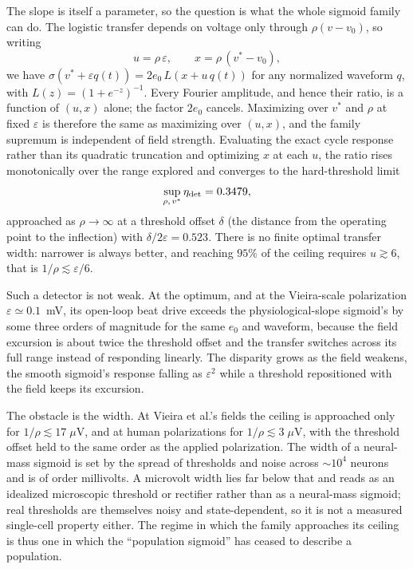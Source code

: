\documentclass[11pt,a4paper]{article}
\newcommand{\Sig}{\sigma}
\begin{document}
The slope is itself a parameter, so the question is what the whole sigmoid family can do.
The logistic transfer depends on voltage only through $\rho(v-v_0)$, so writing
\begin{equation}
u=\rho\,\varepsilon,\qquad x=\rho\,(v^*-v_0),
\label{eq:reduced}
\end{equation}
we have $\Sig(v^*+\varepsilon q(t))=2e_0\,L(x+u\,q(t))$ for any normalized waveform $q$,
with $L(z)=(1+e^{-z})^{-1}$. Every Fourier amplitude, and hence their ratio, is a function
of $(u,x)$ alone; the factor $2e_0$ cancels. Maximizing over $v^*$ and $\rho$ at fixed
$\varepsilon$ is therefore the same as maximizing over $(u,x)$, and the family supremum is
independent of field strength. Evaluating the exact cycle response rather than its
quadratic truncation and optimizing $x$ at each $u$, the ratio rises monotonically over the
range explored and converges to the hard-threshold limit
\begin{equation}
\sup_{\rho,\,v^*}\eta_{\rm det}=0.3479 ,
\label{eq:etasup}
\end{equation}
approached as $\rho\to\infty$ at a threshold offset $\delta$ (the distance from the
operating point to the inflection) with $\delta/2\varepsilon=0.523$. There is no
finite optimal transfer width: narrower is always better, and reaching $95\%$ of the ceiling
requires $u\gtrsim6$, that is $1/\rho\lesssim\varepsilon/6$.

Such a detector is not weak. At the optimum,
and at the Vieira-scale polarization $\varepsilon\!\simeq\!0.1$~mV, its open-loop beat drive
exceeds the physiological-slope sigmoid's by some three orders of magnitude for the same
$e_0$ and waveform, because the field excursion is about twice the threshold offset and the
transfer switches across its full range instead of responding linearly. The disparity grows
as the field weakens, the smooth sigmoid's response falling as $\varepsilon^2$ while a
threshold repositioned with the field keeps its excursion.

The obstacle is the width.
At Vieira et al.'s fields the ceiling is approached only for $1/\rho\lesssim17\;\mu$V, and
at human polarizations for $1/\rho\lesssim3\;\mu$V, with the threshold offset held to the
same order as the applied polarization. The width of a neural-mass sigmoid is set by the
spread of thresholds and noise across $\sim10^4$ neurons and is of order millivolts. A
microvolt width lies far below that and reads as an idealized microscopic threshold or
rectifier rather than as a neural-mass sigmoid; real thresholds are themselves noisy and
state-dependent, so it is not a measured single-cell property either. The
regime in which the family approaches its ceiling is thus one in which the ``population
sigmoid'' has ceased to describe a population.
\end{document}
